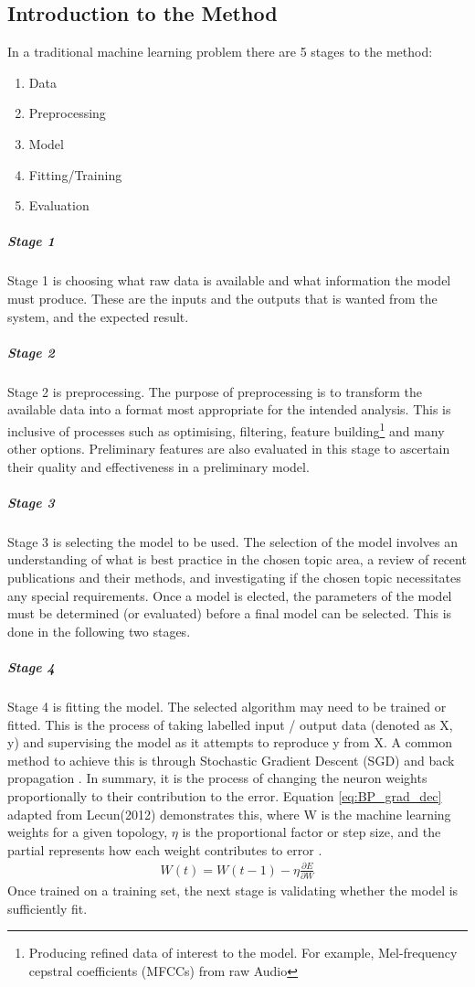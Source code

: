 \documentclass{UoNMCHA}
\newcommand{\eref}[1] {Equation \ref{#1}}
\numberwithin{equation}{section}
\begin{document}
\subsection{Introduction to the Method}
In a traditional machine learning problem there are 5 stages to the method: 
\begin{enumerate}
    \item Data
    \item Preprocessing
    \item Model
    \item Fitting/Training
    \item Evaluation
\end{enumerate}

\subparagraph{Stage 1}
Stage 1 is choosing what raw data is available and what information the model must produce. These are the inputs and the outputs that is wanted from the system, and the expected result.

\subparagraph{Stage 2}
Stage 2 is preprocessing. The purpose of preprocessing is to transform the available data into a format most appropriate for the intended analysis. This is inclusive of processes such as optimising, filtering, feature building\footnote{Producing refined data of interest to the model. For example, Mel-frequency cepstral coefficients (MFCCs) from raw Audio} and many other options. Preliminary features are also evaluated in this stage to ascertain their quality and effectiveness in a preliminary model.

\subparagraph{Stage 3}  
Stage 3 is selecting the model to be used. The selection of the model involves an understanding of what is best practice in the chosen topic area, a review of recent publications and their methods, and investigating if the chosen topic necessitates any special requirements. Once a model is elected, the parameters of the model must be determined (or evaluated) before a final model can be selected. This is done in the following two stages.

\subparagraph{Stage 4}
Stage 4 is fitting the model. The selected algorithm may need to be trained or fitted. This is the process of taking labelled input / output data (denoted as X, y) and supervising the model as it attempts to reproduce y from X. A common method to achieve this is through Stochastic Gradient Descent (SGD) and back propagation \cite{lecun2012efficient}. In summary, it is the process of changing the neuron weights proportionally to their contribution to the error. \eref{eq:BP_grad_dec} adapted from Lecun(2012) demonstrates this, where W is the machine learning weights for a given topology, $\eta$ is the proportional factor or step size, and the partial represents how each weight contributes to error \cite{lecun2012efficient}. 
\begin{gather}\label{eq:BP_grad_dec}
    W(t) = W(t-1) - \eta\frac{\partial E}{\partial W} 
\end{gather}
Once trained on a training set, the next stage is validating whether the model is sufficiently fit.
\end{document}
